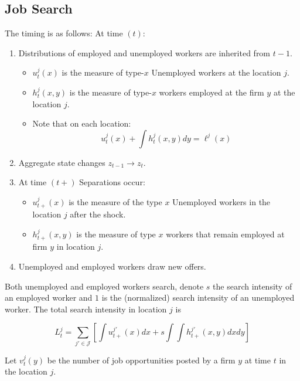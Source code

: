 \documentclass[
  letterpaper,
  DIV=11,
  numbers=noendperiod]{scrreprt}
\providecommand{\tightlist}{%
  \setlength{\itemsep}{0pt}\setlength{\parskip}{0pt}}\usepackage{longtable,booktabs,array}
\begin{document}
\hypertarget{job-search}{%
\subsection{Job Search}\label{job-search}}

The timing is as follows: At time \((t)\):

\begin{enumerate}
\def\labelenumi{\arabic{enumi}.}
\tightlist
\item
  Distributions of employed and unemployed workers are inherited from
  \(t-1\).

  \begin{itemize}
  \tightlist
  \item
    \(u^j_t(x)\) is the measure of type-\(x\) Unemployed workers at the
    location \(j\).
  \item
    \(h^j_t(x,y)\) is the measure of type-\(x\) workers employed at the
    firm \(y\) at the location \(j\).
  \item
    Note that on each location:
    \[u^j_t(x) + \int h^j_t(x,y) dy = \ell^j(x)\]
  \end{itemize}
\item
  Aggregate state changes \(z_{t-1} \to z_{t}\).
\item
  At time \((t+)\) Separations occur:

  \begin{itemize}
  \tightlist
  \item
    \(u^j_{t+}(x)\) is the measure of the type \(x\) Unemployed workers
    in the location \(j\) after the shock.
  \item
    \(h^j_{t+}(x,y)\) is the measure of type \(x\) workers that remain
    employed at firm \(y\) in location \(j\).
  \end{itemize}
\item
  Unemployed and employed workers draw new offers.
\end{enumerate}

Both unemployed and employed workers search, denote \(s\) the search
intensity of an employed worker and \(1\) is the (normalized) search
intensity of an unemployed worker. The total search intensity in
location \(j\) is

\[
  L^j_t = \sum_{j'\in\mathcal{J}}\left[\int u^{j'}_{t+}(x) dx + s\int\int h^{j'}_{t+}(x,y)dx dy\right]
\]

Let \(v^j_t(y)\) be the number of job opportunities posted by a firm
\(y\) at time \(t\) in the location \(j\).
\end{document}
